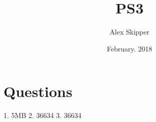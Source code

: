 \documentclass{article}
\title{PS3}
\author{Alex Skipper }
\date{February. 2018}
\begin{document}
\maketitle
\section{Questions}
1. 5MB
2. 36634
3. 36634
\end{document}
